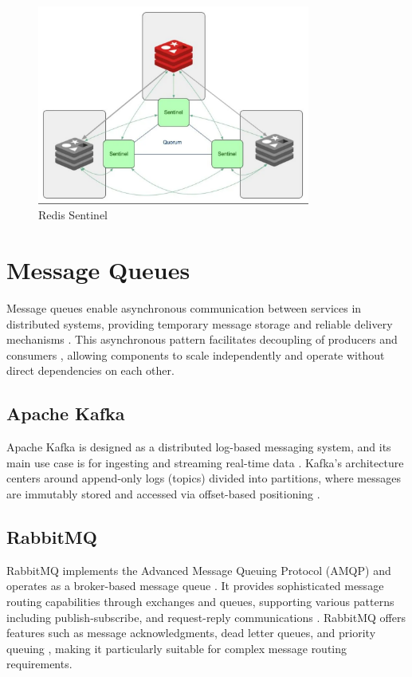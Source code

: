\begin{figure}[H]
    \centering
    \includegraphics[width=0.8\textwidth]{figures/redis_sentinel.png}
    \caption{Redis Sentinel}
    \label{fig:redis_sentinel}
\end{figure}

\section{Message Queues}
Message queues enable asynchronous communication between services in distributed systems, providing temporary message storage and reliable delivery mechanisms \cite{queue_definition}. This asynchronous pattern facilitates decoupling of producers and consumers \cite{queue_decouple}, allowing components to scale independently and operate without direct dependencies on each other. 

\subsection{Apache Kafka}
Apache Kafka is designed as a distributed log-based messaging system, and its main use case is for ingesting and streaming real-time data \cite{kafka_definition}. Kafka's architecture centers around append-only logs (topics) divided into partitions, where messages are immutably stored and accessed via offset-based positioning \cite{kafka_documentation}.

\subsection{RabbitMQ}
RabbitMQ implements the Advanced Message Queuing Protocol (AMQP) \cite{rabbitmq_protocols} and operates as a broker-based message queue \cite{rabbitmq_definition}. It provides sophisticated message routing capabilities through exchanges and queues, supporting various patterns including publish-subscribe, and request-reply communications \cite{rabbitmq_routing}. RabbitMQ offers features such as message acknowledgments, dead letter queues, and priority queuing \cite{rabbitmq_routing}, making it particularly suitable for complex message routing requirements.

